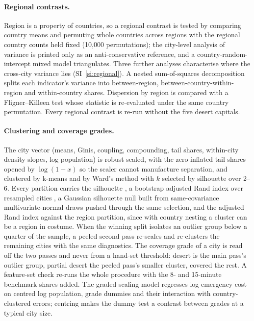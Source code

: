 \documentclass[11pt]{article}
\begin{document}
\paragraph{Regional contrasts.} Region is a property of countries, so a
regional contrast is tested by comparing country means and permuting whole
countries across regions with the regional country counts held fixed
(10{,}000 permutations); the city-level analysis of variance is printed
only as an anti-conservative reference, and a country-random-intercept
mixed model triangulates. Three further analyses characterise where the
cross-city variance lies (SI~\ref{si:regional}). A nested sum-of-squares
decomposition splits each indicator's variance into between-region,
between-country-within-region and within-country shares. Dispersion by
region is compared with a Fligner--Killeen test whose statistic is
re-evaluated under the same country permutation. Every regional contrast is
re-run without the five desert capitals.

\paragraph{Clustering and coverage grades.} The city vector (means,
Ginis, coupling, compounding, tail shares, within-city density slopes, log
population) is robust-scaled, with the zero-inflated tail shares opened by
$\log(1+x)$ so the scaler cannot manufacture separation, and clustered by
k-means and by Ward's method with $k$ selected by silhouette over 2--6.
Every partition carries the silhouette \citep{rousseeuw1987silhouettes},
a bootstrap adjusted Rand index over resampled cities
\citep{hubert1985comparing}, a Gaussian silhouette null built from
same-covariance multivariate-normal draws pushed through the same
selection, and the adjusted Rand index against the region partition,
since with country nesting a cluster can be a region in costume. When the
winning split isolates an outlier group below a quarter of the sample, a
peeled second pass re-scales and re-clusters the remaining cities with the
same diagnostics. The coverage grade of a city is read off the two passes
and never from a hand-set threshold: desert is the main pass's outlier
group, partial desert the peeled pass's smaller cluster, covered the rest.
A feature-set check re-runs the whole procedure with the 8- and 15-minute
benchmark shares added. The graded scaling model regresses log emergency
cost on centred log population, grade dummies and their interaction with
country-clustered errors; centring makes the dummy test a contrast between
grades at a typical city size.
\end{document}
